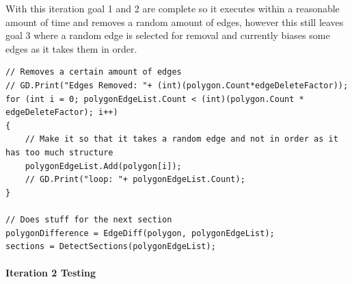 \documentclass{article}
\newcommand{\parBr}{\vspace{5mm}}%
\newcommand{\myparagraph}[1]{\paragraph{#1}\mbox{}\\} %
\begin{document}
\parBr

With this iteration goal 1 and 2 are complete so it executes within a reasonable amount of time and removes a random amount of edges, however this still leaves goal 3 where a random edge is selected for removal and currently biases some edges as it takes them in order.
\begin{lstlisting}
// Removes a certain amount of edges
// GD.Print("Edges Removed: "+ (int)(polygon.Count*edgeDeleteFactor));
for (int i = 0; polygonEdgeList.Count < (int)(polygon.Count * edgeDeleteFactor); i++)
{
    // Make it so that it takes a random edge and not in order as it has too much structure
    polygonEdgeList.Add(polygon[i]);
    // GD.Print("loop: "+ polygonEdgeList.Count);
}

// Does stuff for the next section
polygonDifference = EdgeDiff(polygon, polygonEdgeList);
sections = DetectSections(polygonEdgeList);
\end{lstlisting}

\myparagraph{Iteration 2 Testing}
\end{document}
